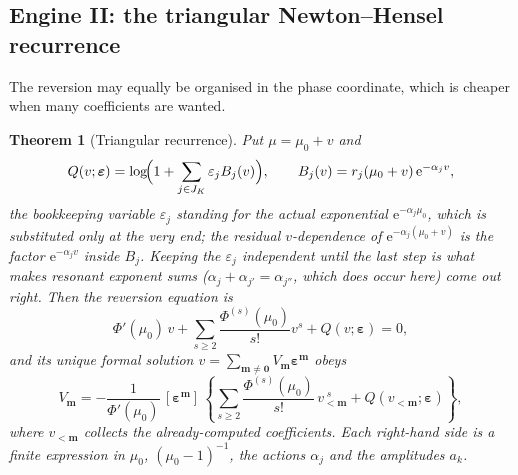 \documentclass[11pt,a4paper,oneside]{book}
\theoremstyle{plain}
\newtheorem{theorem}{Theorem}[chapter]
\theoremstyle{definition}
\theoremstyle{remark}
\newcommand{\e}{\mathrm{e}}
\newcommand{\Coef}[1]{[#1]\,}
\begin{document}
\subsection{Engine II: the triangular Newton--Hensel recurrence}

The reversion may equally be organised in the phase coordinate, which is cheaper when many
coefficients are wanted.

\begin{theorem}[Triangular recurrence]\label{p3:thm:triangular}
Put $\mu=\mu_{0}+v$ and
\begin{equation}\label{p3:eq:Q-def}
 Q(v;\boldsymbol\varepsilon)=\log\!\Bigl(1+\sum_{j\in J_{K}}\varepsilon_{j}B_{j}(v)\Bigr),
 \qquad B_{j}(v)=r_{j}(\mu_{0}+v)\,\e^{-\alpha_{j}v},
\end{equation}
the bookkeeping variable $\varepsilon_{j}$ standing for the actual exponential
$\e^{-\alpha_{j}\mu_{0}}$, which is substituted only at the very end; the residual $v$-dependence
of $\e^{-\alpha_{j}(\mu_{0}+v)}$ is the factor $\e^{-\alpha_{j}v}$ inside $B_{j}$. Keeping the
$\varepsilon_{j}$ independent until the last step is what makes resonant exponent sums
($\alpha_{j}+\alpha_{j'}=\alpha_{j''}$, which does occur here) come out right. Then the reversion
equation is
\begin{equation}\label{p3:eq:v-equation}
 \Phi'(\mu_{0})\,v+\sum_{s\ge2}\frac{\Phi^{(s)}(\mu_{0})}{s!}v^{s}
 +Q(v;\boldsymbol\varepsilon)=0,
\end{equation}
and its unique formal solution $v=\sum_{\boldsymbol m\ne\boldsymbol0}V_{\boldsymbol m}
\boldsymbol\varepsilon^{\boldsymbol m}$ obeys
\begin{equation}\label{p3:eq:triangular}
 V_{\boldsymbol m}=-\frac1{\Phi'(\mu_{0})}\,
 \Coef{\boldsymbol\varepsilon^{\boldsymbol m}}\left\{
 \sum_{s\ge2}\frac{\Phi^{(s)}(\mu_{0})}{s!}\,v_{<\boldsymbol m}^{\;s}
 +Q(v_{<\boldsymbol m};\boldsymbol\varepsilon)\right\},
\end{equation}
where $v_{<\boldsymbol m}$ collects the already-computed coefficients. Each right-hand side is a
finite expression in $\mu_{0}$, $(\mu_{0}-1)^{-1}$, the actions $\alpha_{j}$ and the amplitudes
$a_{k}$.
\end{theorem}
\end{document}
